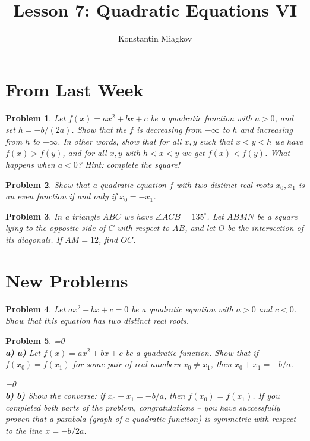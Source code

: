 \documentclass[a4paper,12pt]{article}
\author{Konstantin Miagkov}
\title{Lesson 7: Quadratic Equations VI}
\theoremstyle{perfect}
\newtheorem{prb}{Problem}
\newcommand{\varline}{0}
\renewcommand\part[1]{
\ifnum\pdfstrcmp{\varline}{1}=0
    \vspace{.10in}\textbf{\\#1)}
  \else
    \textbf{#1)}
  \fi\renewcommand{\varline}{1}}
\begin{document}
 
\maketitle

\section{From Last Week}

\begin{prb}
Let $f(x) = ax^2+bx+c$ be a quadratic function with $a > 0$, and set $h = -b/(2a)$. Show that the $f$ is decreasing from $-\infty$ to $h$ and increasing from $h$ to $+\infty$. In other words, show that for all $x,y$ such that $x < y < h$ we have $f(x) > f(y)$, and for all $x,y$ with $h < x < y$ we get $f(x) < f(y)$. What happens when $a < 0$? \textit{Hint: complete the square!}
\end{prb}


\begin{prb}
Show that a quadratic equation $f$ with two distinct real roots $x_0, x_1$ is an even function if and only if $x_0 = -x_1$.
\end{prb}

\begin{prb}
In a triangle $ABC$ we have $\angle ACB = 135^\circ$. Let $ABMN$ be a square lying to the opposite side of $C$ with respect to $AB$, and let $O$ be the intersection of its diagonals. If $AM = 12$, find $OC$.
\end{prb}


\section{New Problems}

\begin{prb}
Let $ax^2+bx+c = 0$ be a quadratic equation with $a > 0$ and $c < 0$. Show that this equation has two distinct real roots.
\end{prb}

\begin{prb}
\part{a} Let $f(x) = ax^2+bx+c$ be a quadratic function. Show that if $f(x_0) = f(x_1)$ for some pair of real numbers $x_0 \neq x_1$, then $x_0+ x_1 = -b/a$.
\part{b} Show the converse: if $x_0+ x_1 = -b/a$, then $f(x_0) = f(x_1)$. If you completed both parts of the problem, congratulations -- you have successfully proven that a parabola (graph of a quadratic function) is symmetric with respect to the line $x = -b/2a$.
\end{prb}
\end{document}
